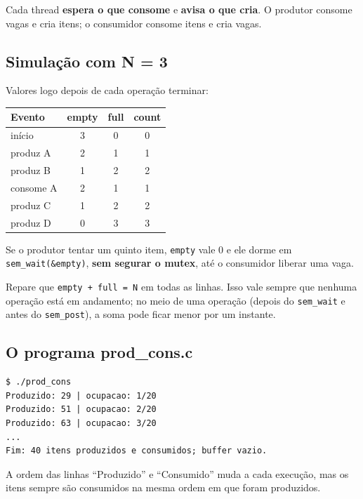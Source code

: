 \documentclass[11pt,a4paper]{article}
\newcommand{\raiz}{../../../..}
\newcommand{\cmd}[1]{\texttt{#1}}
\begin{document}
\begin{exemplo}
Cada thread \textbf{espera o que consome} e \textbf{avisa o que cria}. O produtor consome vagas e cria itens; o consumidor consome itens e cria vagas.
\end{exemplo}

\subsection{Simulação com N = 3}

Valores logo depois de cada operação terminar:

\begin{center}
\begin{tabular}{@{}lccc@{}}
\toprule
\textbf{Evento} & \textbf{empty} & \textbf{full} & \textbf{count} \\
\midrule
início & 3 & 0 & 0 \\
produz A & 2 & 1 & 1 \\
produz B & 1 & 2 & 2 \\
consome A & 2 & 1 & 1 \\
produz C & 1 & 2 & 2 \\
produz D & 0 & 3 & 3 \\
\bottomrule
\end{tabular}
\end{center}

Se o produtor tentar um quinto item, \cmd{empty} vale 0 e ele dorme em \cmd{sem\_wait(\&empty)}, \textbf{sem segurar o mutex}, até o consumidor liberar uma vaga.

Repare que \cmd{empty + full = N} em todas as linhas. Isso vale sempre que nenhuma operação está em andamento; no meio de uma operação (depois do \cmd{sem\_wait} e antes do \cmd{sem\_post}), a soma pode ficar menor por um instante.

\subsection{O programa prod\_cons.c}



\begin{lstlisting}[style=terminal]
$ ./prod_cons
Produzido: 29 | ocupacao: 1/20
Produzido: 51 | ocupacao: 2/20
Produzido: 63 | ocupacao: 3/20
...
Fim: 40 itens produzidos e consumidos; buffer vazio.
\end{lstlisting}

A ordem das linhas ``Produzido'' e ``Consumido'' muda a cada execução, mas os itens sempre são consumidos na mesma ordem em que foram produzidos.
\end{document}
